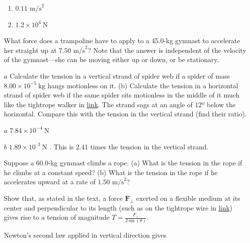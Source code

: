 \documentclass[
]{book}
\providecommand{\tightlist}{%
  \setlength{\itemsep}{0pt}\setlength{\parskip}{0pt}}
\begin{document}
\hypertarget{fs-id2067474}{}
\begin{enumerate}
\def\labelenumi{\alph{enumi}.}
\tightlist
\item
  \({0.\text{11\ m/s}^{2}}{}\)
\item
  \({1\text{.}{2 \times \text{10}^{4}}\ \text{N}}{}\)
\end{enumerate}

\hypertarget{fs-id1600446}{}
\leavevmode{}%
What force does a trampoline have to apply to a 45.0-kg gymnast to
accelerate her straight up at \({7\text{.}\text{50\ m/s}^{2}}{}\)? Note
that the answer is independent of the velocity of the gymnast---she can
be moving either up or down, or be stationary.

\hypertarget{fs-id2666528}{}
\leavevmode{}%
\(a\) Calculate the tension in a vertical strand of spider web if a
spider of mass
\({8\text{.}{\text{00} \times \text{10}^{- 5}}\ \text{kg}}{}\) hangs
motionless on it. (b) Calculate the tension in a horizontal strand of
spider web if the same spider sits motionless in the middle of it much
like the tightrope walker in
\protect\hyperlink{import-auto-id2091042}{link}. The strand sags
at an angle of \(\text{12º}{}\) below the horizontal. Compare this with
the tension in the vertical strand (find their ratio).

\leavevmode{}%
\(a\) \({7\text{.}{\text{84} \times \text{10}^{-4}}\ \text{N}}{}\)

\(b\) \({1\text{.}{\text{89} \times \text{10}^{–3}}\ \text{N}}{}\) . This
is 2.41 times the tension in the vertical strand.

\hypertarget{fs-id1914521}{}
\leavevmode{}%
Suppose a 60.0-kg gymnast climbs a rope. (a) What is the tension in the
rope if he climbs at a constant speed? (b) What is the tension in the
rope if he accelerates upward at a rate of
\({1\text{.}\text{50\ m/s}^{2}}{}\)?

\hypertarget{fs-id858402}{}
\leavevmode{}%
Show that, as stated in the text, a force \(\textbf{F}_{\bot}{}\) exerted
on a flexible medium at its center and perpendicular to its length (such
as on the tightrope wire in
\protect\hyperlink{import-auto-id2091042}{link}) gives rise to a
tension of magnitude \({T = \frac{F_{\bot}}{2\ \text{sin}\ (\theta)}}{}\).

\leavevmode{}%
Newton's second law applied in vertical direction gives
\end{document}
